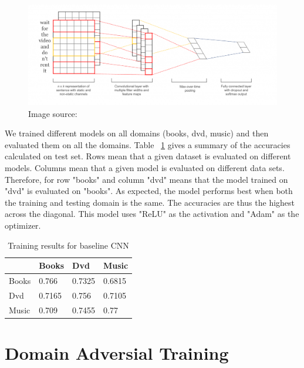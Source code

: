 \documentclass[11pt,a4paper]{article}
\begin{document}
\begin{figure}[htb]
\begin{center}
\includegraphics[width=\columnwidth]{cnn.png}
\end{center}
\caption{Image source: ~\cite{Britz}}
\label{fig:figure1}
\end{figure}

We trained different models on all domains (books, dvd, music) and then evaluated them on all the domains. Table ~\ref{cnn-table} gives a summary of the accuracies calculated on test set. Rows mean that a given dataset is evaluated on different models. Columns mean that a given model is evaluated on different data sets. Therefore, for row "books" and column "dvd" means that the model trained on "dvd" is evaluated on "books". As expected, the model performs best when both the training and testing domain is the same. The accuracies are thus the highest across the diagonal. This model uses "ReLU" as the activation and "Adam" as the optimizer.


\begin{table}[h]
\begin{center}
\begin{tabular}{|l|l|l|l|}
\hline \bf & \bf Books & \bf Dvd & \bf Music \\ \hline
Books & 0.766 & 0.7325 & 0.6815 \\
Dvd & 0.7165 & 0.756 & 0.7105 \\
Music & 0.709 & 0.7455 & 0.77 \\
\hline
\end{tabular}
\end{center}
\caption{ Training results for baseline CNN }
\label{cnn-table}
\end{table}



\section{Domain Adversial Training}
\end{document}
